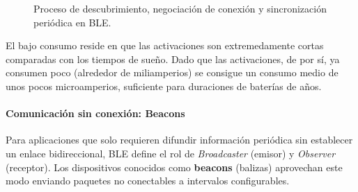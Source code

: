 \documentclass[../main.tex]{subfiles}
\begin{document}
\begin{figure}[h]
                    \caption{Proceso de descubrimiento, negociación de conexión y sincronización periódica en BLE.}
                    \label{fig:ble_sync}
                \end{figure}


                El bajo consumo reside en que las activaciones son extremedamente cortas comparadas con los tiempos de sueño. Dado que las activaciones, de por sí, ya consumen poco (alrededor de miliamperios) se consigue un consumo medio de unos pocos microamperios, suficiente para duraciones de baterías de años.

                \paragraph{Comunicación sin conexión: Beacons}
                    Para aplicaciones que solo requieren difundir información periódica sin establecer un enlace bidireccional, BLE define el rol de \emph{Broadcaster} (emisor) y \emph{Observer} (receptor). Los dispositivos conocidos como \textbf{beacons} (balizas) aprovechan este modo enviando paquetes no conectables a intervalos configurables.
\end{document}
